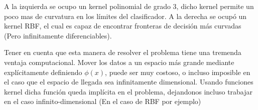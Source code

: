 A la izquierda se ocupo un kernel polinomial de grado $3$, dicho kernel permite un poco mas de curvatura en los límites del clasificador. A la derecha se ocupó un kernel RBF, el cual es capaz de encontrar fronteras de decisión más curvadas (Pero infinitamente diferenciables). 

Tener en cuenta que esta manera de resolver el problema tiene una tremenda ventaja computacional. Mover los datos a un espacio más grande mediante explícitamente definiendo $\phi(x)$, puede ser muy costoso, o incluso imposible en el caso que el espacio de llegada sea infinitamente dimensional. Usando funciones kernel dicha función queda implícita en el problema, dejandonos incluso trabajar en el caso infinito-dimensional (En el caso de RBF por ejemplo)




